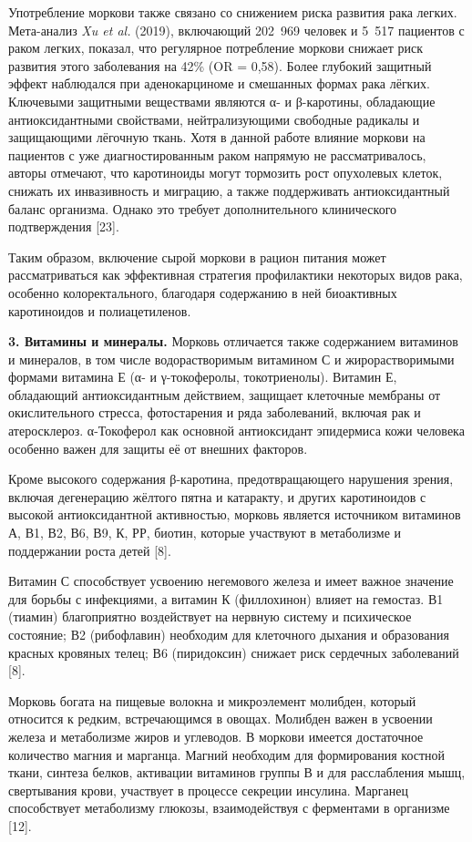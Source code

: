 Употребление моркови также связано со снижением риска развития рака
легких. Мета-анализ \emph{Xu et al.} (2019), включающий 202~969 человек
и 5~517 пациентов с раком легких, показал, что регулярное потребление
моркови снижает риск развития этого заболевания на 42\% (OR = 0,58).
Более глубокий защитный эффект наблюдался при аденокарциноме и смешанных
формах рака лёгких. Ключевыми защитными веществами являются α- и
β-каротины, обладающие антиоксидантными свойствами, нейтрализующими
свободные радикалы и защищающими лёгочную ткань. Хотя в данной работе
влияние моркови на пациентов с уже диагностированным раком напрямую не
рассматривалось, авторы отмечают, что каротиноиды могут тормозить рост
опухолевых клеток, снижать их инвазивность и миграцию, а также
поддерживать антиоксидантный баланс организма. Однако это требует
дополнительного клинического подтверждения {[}23{]}.

Таким образом, включение сырой моркови в рацион питания может
рассматриваться как эффективная стратегия профилактики некоторых видов
рака, особенно колоректального, благодаря содержанию в ней биоактивных
каротиноидов и полиацетиленов.

{\bfseries 3. Витамины и минералы.} Морковь отличается также содержанием
витаминов и минералов, в том числе водорастворимым витамином С и
жирорастворимыми формами витамина Е (α- и γ-токоферолы, токотриенолы).
Витамин Е, обладающий антиоксидантным действием, защищает клеточные
мембраны от окислительного стресса, фотостарения и ряда заболеваний,
включая рак и атеросклероз. α-Токоферол как основной антиоксидант
эпидермиса кожи человека особенно важен для защиты её от внешних
факторов.

Кроме высокого содержания β-каротина, предотвращающего нарушения зрения,
включая дегенерацию жёлтого пятна и катаракту, и других каротиноидов с
высокой антиоксидантной активностью, морковь является источником
витаминов А, В1, В2, В6, В9, К, РР, биотин, которые участвуют в
метаболизме и поддержании роста детей {[}8{]}.

Витамин С способствует усвоению негемового железа и имеет важное
значение для борьбы с инфекциями, а витамин К (филлохинон) влияет на
гемостаз. В1 (тиамин) благоприятно воздействует на нервную систему и
психическое состояние; В2 (рибофлавин) необходим для клеточного дыхания
и образования красных кровяных телец; В6 (пиридоксин) снижает риск
сердечных заболеваний {[}8{]}.

Морковь богата на пищевые волокна и микроэлемент молибден, который
относится к редким, встречающимся в овощах. Молибден важен в усвоении
железа и метаболизме жиров и углеводов. В моркови имеется достаточное
количество магния и марганца. Магний необходим для формирования костной
ткани, синтеза белков, активации витаминов группы В и для расслабления
мышц, свертывания крови, участвует в процессе секреции инсулина.
Марганец способствует метаболизму глюкозы, взаимодействуя с ферментами в
организме {[}12{]}.

